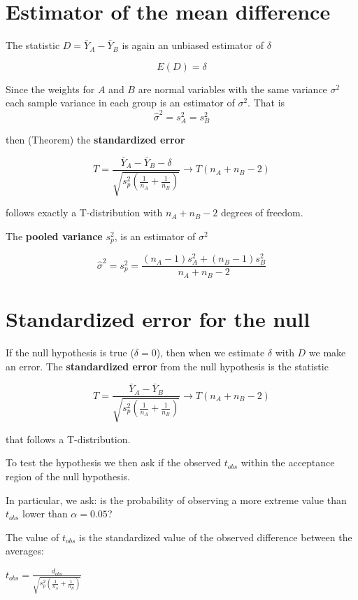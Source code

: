 \documentclass[
]{book}
\begin{document}
\hypertarget{estimator-of-the-mean-difference}{%
\section{Estimator of the mean difference}\label{estimator-of-the-mean-difference}}

The statistic \(D=\bar{Y}_A-\bar{Y}_B\) is again an unbiased estimator of \(\delta\)

\[E(D)=\delta\]

Since the weights for \(A\) and \(B\) are normal variables with the same variance \(\sigma^2\) each sample variance in each group is an estimator of \(\sigma^2\). That is \[\hat{\sigma}^2=s^2_A=s^2_B\]

then (Theorem) the \textbf{standardized error}

\[T=\frac{\bar{Y}_A-\bar{Y}_B -\delta}{\sqrt{s_p^2(\frac{1}{n_A}+\frac{1}{n_B})}} \rightarrow T(n_A+n_B-2)\]

follows exactly a T-distribution with \(n_A+n_B-2\) degrees of freedom.

The \textbf{pooled variance} \(s_p^2\), is an estimator of \(\sigma^2\)

\[\hat{\sigma}^2=s_p^2= \frac{(n_A-1) s^2_A+(n_B-1) s^2_B}{n_A+n_B-2}\]

\hypertarget{standardized-error-for-the-null-1}{%
\section{Standardized error for the null}\label{standardized-error-for-the-null-1}}

If the null hypothesis is true (\(\delta=0\)), then when we estimate \(\delta\) with \(D\) we make an error. The \textbf{standardized error} from the null hypothesis is the statistic

\[T=\frac{\bar{Y}_A-\bar{Y}_B }{\sqrt{s_p^2(\frac{1}{n_A}+\frac{1}{n_B})}} \rightarrow T(n_A+n_B-2)\]

that follows a T-distribution.

To test the hypothesis we then ask if the observed \(t_{obs}\) within the acceptance region of the null hypothesis.

In particular, we ask: is the probability of observing a more extreme value than \(t_{obs}\) lower than \(\alpha=0.05\)?

The value of \(t_{obs}\) is the standardized value of the observed difference between the averages:

\(t_{obs}=\frac{d_{obs}}{\sqrt{s_p^2(\frac{1}{n_A}+\frac{1}{n_B})}}\)
\end{document}
